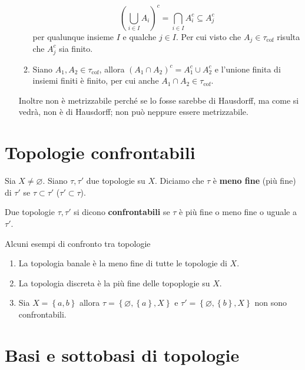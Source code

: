\begin{example}
\begin{enumerate}
\begin{enumerate}
			\begin{equation*}
					\left(\bigcup_{i \in I} A_i\right)^c = \bigcap_{i \in I} A^c_i \subseteq A^c_j
			\end{equation*}
		per qualunque insieme $I$ e qualche $j \in I$. Per cui visto che $A_j \in \tau_{\text{cof}}$ risulta che $A^c_j$ sia finito.
		\item Siano $A_1, A_2 \in \tau_{\text{cof}}$, allora $(A_1 \cap A_2)^c = A^c_1 \cup A^c_2$ e l'unione finita di insiemi finiti è finito, per cui anche $A_1 \cap A_2 \in \tau_{\text{cof}}$. 
	\end{enumerate}	
	Inoltre non è metrizzabile perché se lo fosse sarebbe di Hausdorff, ma come si vedrà, non è di Hausdorff; non può neppure essere metrizzabile.
\end{enumerate}
\end{example}

\section{Topologie confrontabili}

\begin{definition}
	Sia $X \neq \varnothing$. Siano $\tau, \tau'$ due topologie su $X$. Diciamo che $\tau$ è \textbf{meno fine} (più fine) di $\tau'$ se $\tau \subset \tau'$ ($\tau' \subset \tau$).
\end{definition}

\begin{definition}
	Due topologie $\tau, \tau'$ si dicono \textbf{confrontabili} se $\tau$ è più fine o meno fine o uguale a $\tau'$.
\end{definition}

\begin{example}
	Alcuni esempi di confronto tra topologie
	\begin{enumerate}
		\item La topologia banale è la meno fine di tutte le topologie di $X$.
		\item La topologia discreta è la più fine delle topoplogie su $X$.
		\item Sia $X = \left\{a,b\right\}$ allora $\tau = \left\{\varnothing,\left\{a\right\}, X\right\}$ e $\tau' = \left\{\varnothing, \left\{b\right\}, X\right\}$ non sono confrontabili.
	\end{enumerate}
\end{example}


\section{Basi e sottobasi di topologie}


